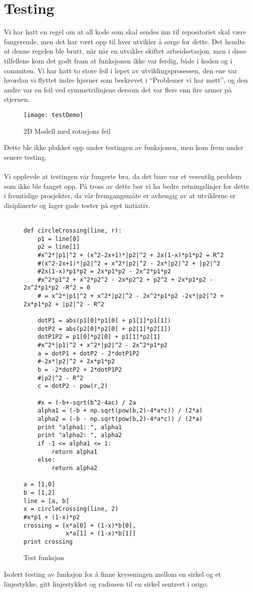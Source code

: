 \section{Testing}
Vi har hatt en regel om at all kode som skal sendes inn til repositoriet skal være fungerende, men det har vært opp til hver utvikler å sørge for dette. Det hendte at denne regelen ble brutt, når når en utvikler skiftet arbeidsstasjon, men i disse tilfellene kom det godt fram at funksjonen ikke var ferdig, både i koden og i commiten. Vi har hatt to store feil i løpet av utviklingsprosessen, den ene var hvordan vi flyttet indre hjørner som beskrevet i “Problemer vi har møtt”, og den andre var en feil ved symmetrilinjene dersom det var flere enn fire armer på stjernen. \\
\begin{figure}[H]
    \centering
    \texttt{[image: testDemo]}
    \caption{2D Modell med rotasjons feil}
    \label{fig:my_label}
\end{figure}
\noindent
Dette ble ikke plukket opp under testingen av funksjonen, men kom frem under senere testing.\\ \\
\noindent
Vi opplevde at testingen vår fungerte bra, da det bare var et vesentlig problem som ikke ble fanget opp. På tross av dette bør vi ha bedre retningslinjer for dette i fremtidige prosjekter, da vår fremgangsmåte er avhengig av at utviklerne er disiplinerte og lager gode tester på eget initiativ.\\ \\
\clearpage
\begin{figure}[h]

\lstset{language=Python, breaklines=true,} 
\begin{lstlisting}[frame=single]
def circleCrossing(line, r):
    p1 = line[0]
    p2 = line[1]
    #x^2*|p1|^2 + (x^2-2x+1)*|p2|^2 + 2x(1-x)*p1*p2 = R^2
    #(x^2-2x+1)*|p2|^2 = x^2*|p2|^2 - 2x*|p2|^2 + |p2|^2
    #2x(1-x)*p1*p2 = 2x*p1*p2 - 2x^2*p1*p2
    #x^2*p1^2 + x^2*p2^2 - 2x*p2^2 + p2^2 + 2x*p1*p2 - 2x^2*p1*p2 -R^2 = 0
    # = x^2*|p1|^2 + x^2*|p2|^2 - 2x^2*p1*p2 -2x*|p2|^2 + 2x*p1*p2 + |p2|^2 - R^2
    
    dotP1 = abs(p1[0]*p1[0] + p1[1]*p1[1])
    dotP2 = abs(p2[0]*p2[0] + p2[1]*p2[1])
    dotP1P2 = p1[0]*p2[0] + p1[1]*p2[1]
    #x^2*|p1|^2 + x^2*|p2|^2 - 2x^2*p1*p2
    a = dotP1 + dotP2 - 2*dotP1P2
    #-2x*|p2|^2 + 2x*p1*p2
    b = -2*dotP2 + 2*dotP1P2
    #|p2|^2 - R^2
    c = dotP2 - pow(r,2)
    
    #x = (-b+-sqrt(b^2-4ac) / 2a
    alpha1 = (-b + np.sqrt(pow(b,2)-4*a*c)) / (2*a)
    alpha2 = (-b - np.sqrt(pow(b,2)-4*a*c)) / (2*a)
    print "alpha1: ", alpha1
    print "alpha2: ", alpha2
    if -1 <= alpha1 <= 1:
        return alpha1
    else:
        return alpha2

a = [1,0]
b = [1,2]
line = [a, b]
x = circleCrossing(line, 2)
#x*p1 + (1-x)*p2
crossing = [x*a[0] + (1-x)*b[0],
            x*a[1] + (1-x)*b[1]]
print crossing
\end{lstlisting}
\caption{Test funksjon}
\end{figure}
\noindent
Isolert testing av funksjon for å finne kryssningen mellom en sirkel og et linjestykke, gitt linjestykket og radiusen til en sirkel sentrert i origo.
